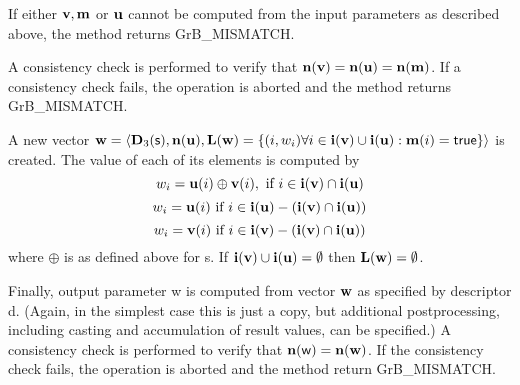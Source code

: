 If either ${\bf v}, {\bf m}$ or ${\bf u}$ cannot be computed
from the input parameters as described above, the method returns {\sf
GrB\_MISMATCH}.

A consistency check is performed to verify that $\bold{n}({\bf v})
= \bold{n}({\bf u}) = \bold{n}({\bf m})$. If a consistency check fails, the operation is
aborted and the method returns {\sf GrB\_MISMATCH}.

A new vector ${\bf w} = \langle \bold{D}_3({\sf s}),
\bold{n}({\bf u}), \bold{L}({\bf w}) = \{(i,w_i)  \forall i \in
{\bf i}({\bf v}) \cup {\bf i}({\bf u}) : {\bf m}(i)
= {\sf true} \} \rangle$ is created.  The value of each of its
elements is computed by 
\[
w_i = {\bf u}(i) \oplus {\bf v}(i), \ \mbox{if}\  i \in  {\bf i}({\bf v}) \cap {\bf i}({\bf u})
\]
\[
w_i = {\bf u}(i) \ \mbox{if}\  i \in  {\bf i}({\bf u}) - ({\bf i}({\bf v}) \cap {\bf i}({\bf u}))
\]
\[
w_i = {\bf v}(i) \ \mbox{if}\  i \in  {\bf i}({\bf v}) - ({\bf i}({\bf v}) \cap {\bf i}({\bf u}))
\]
where $\oplus$ is as defined above for {\sf s}.
If ${\bf i}({\bf v}) \cup {\bf i}({\bf u}) = \emptyset$
then $\bold{L}({\bf w}) = \emptyset$.

Finally, output parameter {\sf w} is computed from vector ${\bf w}$
as specified by descriptor {\sf d}. (Again, in the simplest case this
is just a copy, but additional postprocessing, including casting and
accumulation of result values, can be specified.)  A consistency check is
performed to verify that $\bold{n}({\sf w}) = \bold{n}({\bf w})$. If
the consistency check fails, the operation is aborted and the method
return {\sf GrB\_MISMATCH}.
